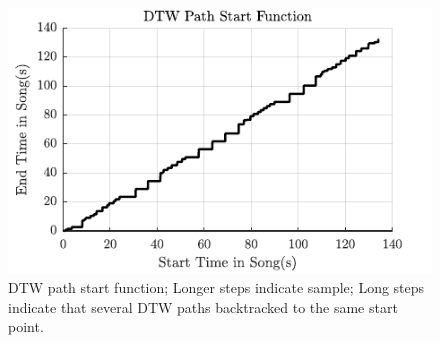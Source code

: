 \documentclass{article}
\begin{document}

\begin{figure}[t]
\centering
\includegraphics[width=\linewidth]{step.pdf}
\caption{DTW path start function; Longer steps indicate sample; Long steps indicate that several DTW paths backtracked to the same start point.}
\label{fig4}
\end{figure}

\end{document}
